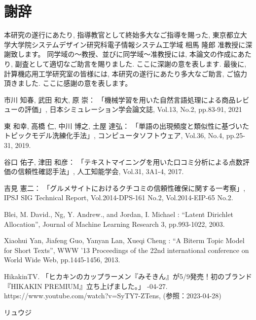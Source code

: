 \documentclass{ltjarticle}
\begin{document}
\newpage
\part*{謝辞}
本研究の遂行にあたり, 指導教官として終始多大なご指導を賜った, 
東京都立大学大学院システムデザイン研究科電子情報システム工学域 相馬 隆郎 准教授に深謝致します。
同学域の～教授、並びに同学域～准教授には, 本論文の作成にあたり, 副査として適切なご助言を賜りました. ここに深謝の意を表します. 
最後に, 計算機応用工学研究室の皆様には, 本研究の遂行にあたり多大なご助言, ご協力頂きました. ここに感謝の意を表します。

\newpage
\begin{thebibliography}{99}
    市川 知春, 武田 和大, 原 崇：
    \newblock 「機械学習を用いた自然言語処理による商品レビューの評価」, 
    \newblock 日本シミュレーション学会論文誌, Vol.13, No.2, pp.83-91, 2021

    東 和幸, 高橋 仁, 中川 博之, 土屋 達弘：
    \newblock 「単語の出現頻度と類似性に基づいたトピックモデル洗練化手法」, 
    \newblock コンピュータソフトウェア, Vol.36, No.4, pp.25-31, 2019.

    谷口 佑子, 津田 和彦：
    \newblock 「テキストマイニングを用いた口コミ分析による点数評価の信頼性確認手法」, 
    \newblock 人工知能学会, Vol.31, 3A1-4, 2017.

    吉見 憲二：
    \newblock 「グルメサイトにおけるクチコミの信頼性確保に関する一考察」, 
    \newblock IPSJ SIG Technical Report, Vol.2014-DPS-161 No.2, Vol.2014-EIP-65 No.2.   

    Blei, M. David., Ng, Y. Andrew., and Jordan, I. Michael : 
    \newblock ``Latent Dirichlet Allocation'', 
    \newblock Journal of Machine Learning Research 3, pp.993-1022, 2003.

    Xiaohui Yan, Jiafeng Guo, Yanyan Lan, Xueqi Cheng :
    \newblock ``A Biterm Topic Model for Short Texts'', 
    \newblock WWW '13 Proceedings of the 22nd international conference on World Wide Web, pp.1445-1456, 2013.

    HikakinTV. 「ヒカキンのカップラーメン『みそきん』が5/9発売！初のブランド『HIKAKIN PREMIUM』立ち上げました。」
    -04-27. 
    \newblock https://www.youtube.com/watch?v=SyTY7-ZTens, (参照：2023-04-28)

    リュウジ
     
\end{thebibliography}
\end{document}
